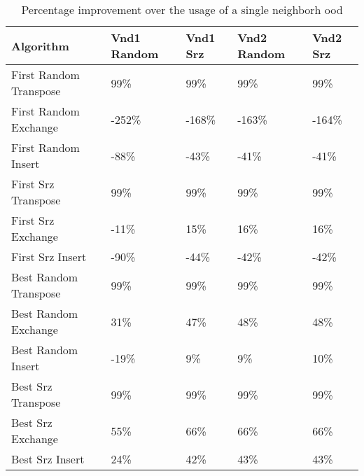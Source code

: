 \documentclass[]{article}
\begin{document}
	\begin{table}[H]
		\centering
		\caption{Percentage improvement over the usage of a single neighborh
			ood}
		\label{tab:table1}
		\begin{tabular}{l{|}llll}
			\toprule
			Algorithm&Vnd1 Random&Vnd1 Srz&Vnd2 Random&Vnd2 Srz\\
			\midrule
			First Random Transpose &\color{OliveGreen}99\%
			&\color{OliveGreen}99\%
			&\color{OliveGreen}99\%
			&\color{OliveGreen}99\%
			\\ 
			
			First Random Exchange  &\color{Red}-252\%
			&\color{Red}-168\%
			&\color{Red}-163\%
			&\color{Red}-164\%
			\\  
			First Random Insert  &\color{Red}-88\%
			&\color{Red}-43\%
			&\color{Red}-41\%
			&\color{Red}-41\%
			\\
			First Srz Transpose  &\color{OliveGreen}99\%
			&\color{OliveGreen}99\%
			&\color{OliveGreen}99\%
			&\color{OliveGreen}99\%
			\\ 
			First Srz Exchange  &\color{Red}-11\%
			&\color{OliveGreen}15\%
			&\color{OliveGreen}16\%
			&\color{OliveGreen}16\%
			\\
			First Srz Insert  &\color{Red}-90\%
			&\color{Red}-44\%
			&\color{Red}-42\%
			&\color{Red}-42\%
			\\
			
			Best Random Transpose &\color{OliveGreen}99\%
			&\color{OliveGreen}99\%
			&\color{OliveGreen}99\%
			&\color{OliveGreen}99\%
			\\ 
			Best Random Exchange  &\color{OliveGreen}31\%
			&\color{OliveGreen}47\%
			&\color{OliveGreen}48\%
			&\color{OliveGreen}48\%
			\\
			Best Random Insert  &\color{Red}-19\%
			&\color{OliveGreen}9\%
			&\color{OliveGreen}9\%
			&\color{OliveGreen}10\%
			\\ 
			Best Srz Transpose &\color{OliveGreen}99\%
			&\color{OliveGreen}99\%
			&\color{OliveGreen}99\%
			&\color{OliveGreen}99\%
			\\ 
			Best Srz Exchange  &\color{OliveGreen}55\%
			&\color{OliveGreen}66\%
			&\color{OliveGreen}66\%
			&\color{OliveGreen}66\%
			\\ 
			Best Srz Insert  &\color{OliveGreen}24\%
			&\color{OliveGreen}42\%
			&\color{OliveGreen}43\%
			&\color{OliveGreen}43\%
			\\ 
			
			
			\bottomrule
		\end{tabular}
	\end{table}
	
\end{document}
